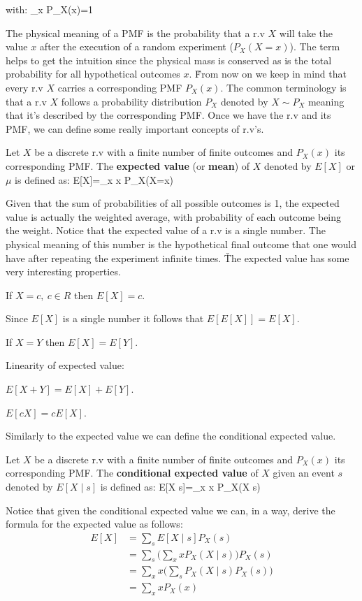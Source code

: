 with:
\bse
\sum_{x} P_{X}(x)=1
\ese
\ed

The physical meaning of a PMF is the probability that a r.v $X$ will take the value $x$ after the execution of a
random experiment ($P_{X}(X=x)$). The term  helps to get the intuition since the physical mass is conserved
as is the total probability for all hypothetical outcomes $x$. \v

From now on we keep in mind that every r.v $X$ carries a corresponding PMF $P_{X}(x)$. The common terminology is that
a r.v $X$ follows a probability distribution $P_{X}$ denoted by $X \sim P_{X}$ meaning that it's described by the
corresponding PMF. Once we have the r.v and its PMF, we can define some really important concepts of r.v's.

Let $X$ be a discrete r.v with a finite number of finite outcomes and $P_{X} (x)$ its corresponding PMF. The
\textbf{expected value} (or \textbf{mean}) of $X$ denoted by $E[X]$ or $\mu$ is defined as:
\bse
E[X]=\sum _{x} x \cdot P_{X}(X=x)
\ese
\ed

Given that the sum of probabilities of all possible outcomes is 1, the expected value is actually the weighted
average, with probability of each outcome being the weight. Notice that the expected value of a r.v is a single
number. The physical meaning of this number is the hypothetical final outcome that one would have after repeating the
experiment infinite times. \v

The expected value has some very interesting properties.
\ben
\item If $X=c, \: c \in R$ then $E[X]=c$.
\item Since $E[X]$ is a single number it follows that $E[E[X]]=E[X]$.
\item If $X = Y$ then $E[X] = E[Y]$.
\item Linearity of expected value:
\bit
\item $E[X+Y] = E[X] + E[Y]$.
\item $E[c X] = c E[X]$.
\eit
\een

Similarly to the expected value we can define the conditional expected value.

Let $X$ be a discrete r.v with a finite number of finite outcomes and $P_{X} (x)$ its corresponding PMF. The
\textbf{conditional expected value} of $X$ given an event $s$ denoted by $E[X \mid s]$ is defined as:
\bse
E[X \mid s]=\sum _{x} x P_{X}(X \mid s)
\ese
\ed

Notice that given the conditional expected value we can, in a way, derive the formula for the expected value as follows:
\begin{align*}
E[X] &= \sum_{s} E[X \mid s] P_{X}(s) \\
&= \sum_{s} \Big( \sum_{x} x P_{X}(X \mid s) \Big) P_{X}(s) \\
&= \sum_{x} x \Big( \sum_{s} P_{X}(X \mid s) P_{X}(s) \Big) \\
&= \sum_{x} x P_{X}(x)
\end{align*}

